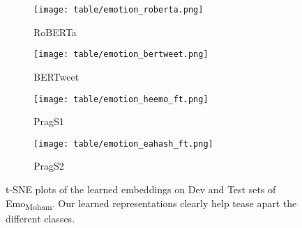 \begin{figure}[h]
\centering
\begin{subfigure}[b]{.235\textwidth}
  \centering
  \texttt{[image: table/emotion\_roberta.png]}
  \caption{RoBERTa}
\end{subfigure}
\hfill
\begin{subfigure}[b]{.235\textwidth}
  \centering
  \texttt{[image: table/emotion\_bertweet.png]}
  \caption{BERTweet}
\end{subfigure}
\hfill
\begin{subfigure}[b]{.235\textwidth}
  \centering
  \texttt{[image: table/emotion\_heemo\_ft.png]}
  \caption{PragS1}
\end{subfigure}
\hfill
\begin{subfigure}[b]{.235\textwidth}
  \centering
  \texttt{[image: table/emotion\_eahash\_ft.png]}
  \caption{PragS2}
\end{subfigure}
     
\caption{t-SNE plots of the learned embeddings on Dev and Test sets of Emo\textsubscript{Moham}. Our learned representations clearly help tease apart the different classes.}
\label{fig:tsne_task}
\end{figure}
